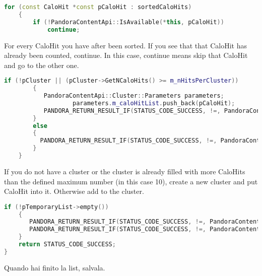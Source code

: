 \begin{lstlisting}[language=C++]
	for (const CaloHit *const pCaloHit : sortedCaloHits)
	{
		if (!PandoraContentApi::IsAvailable(*this, pCaloHit))
		    continue;
\end{lstlisting}
For every CaloHit you have after been sorted. If you see that that CaloHit has already been counted, continue. In this case, continue means skip that CaloHit and go to the other one.
\begin{lstlisting}[language=C++]
		if (!pCluster || (pCluster->GetNCaloHits() >= m_nHitsPerCluster))
		{
		   PandoraContentApi::Cluster::Parameters parameters;
                   parameters.m_caloHitList.push_back(pCaloHit);
		   PANDORA_RETURN_RESULT_IF(STATUS_CODE_SUCCESS, !=, PandoraContentApi::Cluster::Create(*this, parameters, pCluster));
		}
  		else
 		{
		  PANDORA_RETURN_RESULT_IF(STATUS_CODE_SUCCESS, !=, PandoraContentApi::AddToCluster(*this, pCluster, pCaloHit));
		}
	}
\end{lstlisting}
If you do not have a cluster or the cluster is already filled with more CaloHits than the defined maximum number (in this case 10), create a new cluster and put CaloHit into it. Otherwise add to the cluster.
\begin{lstlisting}[language=C++]
	if (!pTemporaryList->empty())
	{
	   PANDORA_RETURN_RESULT_IF(STATUS_CODE_SUCCESS, !=, PandoraContentApi::SaveList<Cluster>(*this, m_outputClusterListName));
	   PANDORA_RETURN_RESULT_IF(STATUS_CODE_SUCCESS, !=, PandoraContentApi::ReplaceCurrentList<Cluster>(*this, m_outputClusterListName));
	}
	return STATUS_CODE_SUCCESS;
}
\end{lstlisting}
Quando hai finito la list, salvala.

\begin{lstlisting}[language=C++]
\end{lstlisting}

\begin{lstlisting}[language=C++]
\end{lstlisting}

